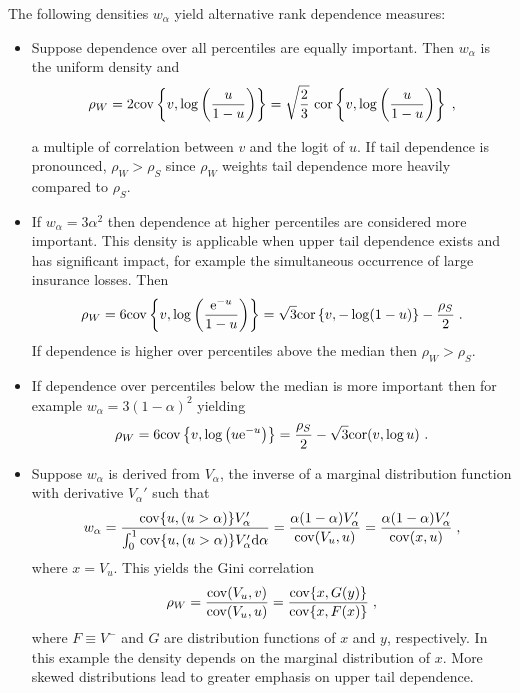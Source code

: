 \documentclass[authoryear]{elsarticle}
\newcommand{\cov}{{\rm cov}}
\newcommand{\cor}{\mathrm{cor}}
\newcommand{\e}{\mathrm{e}}
\newcommand{\de}{\mathrm{d}}
\begin{document}
The following densities $w_\alpha$ yield alternative rank dependence measures:
\begin{itemize}

\item Suppose dependence over all percentiles are equally important.   Then $w_\alpha$ is the uniform density and
$$
\rho_W =2\cov\left\{v,\log\left(\frac{u}{1-u}\right)\right\}
= \sqrt{\frac{2}{3}}\ \cor\left\{v,\log\left(\frac{u}{1-u}\right)\right\} \;,
$$

a multiple of correlation between $v$ and the logit of $u$. If tail dependence is pronounced, $\rho_W>\rho_S$ since $\rho_W$ weights tail dependence more heavily compared to $\rho_S$.

\item If $w_\alpha=3\alpha^2$  then dependence at higher percentiles are considered more important. This density is applicable when upper tail dependence exists and has significant impact, for example the simultaneous occurrence of large insurance losses. Then
$$
\rho_W = 6\cov\left\{v,\log\left(\frac{\e^{-u}}{1-u}\right) \right\}
=\sqrt{3} \cor\left\{v,-\log(1-u)\right\}-\frac{\rho_S}{2}\;.
$$
If dependence is higher over percentiles above the median then $\rho_W>\rho_S$.

\item If dependence over percentiles below the median is more important then for example  $w_\alpha=3(1-\alpha)^2$ yielding
$$
\rho_W = 6\cov\left\{v,\log \left( u \e^{-u}\right) \right\}
= \frac{\rho_S}{2}  - \sqrt{3}\cor(v,\log u ) \ .
$$


\item Suppose $w_\alpha$ is derived from $V_\alpha$, the inverse of a marginal distribution function with derivative $V_\alpha'$ such that
$$
w_\alpha = \frac{\cov\{u,(u>\alpha)\}V_\alpha'}{\int_0^1 \cov\{u,(u>\alpha)\}V_\alpha' \de\alpha}
=\frac{\alpha(1-\alpha)V_\alpha'}{\cov(V_u,u)}
=\frac{\alpha(1-\alpha)V_\alpha'}{\cov(x,u)} \;,
$$
where $x=V_u$. This yields the Gini correlation  \citep{schechtman1999proper}
$$
\rho_W=\frac{\cov(V_u,v)}{\cov(V_u,u)} = \frac{\cov\{x,G(y)\}}{\cov\{x,F(x)\}} \;,
$$
where $F\equiv V^-$ and $G$ are distribution functions of $x$ and $y$, respectively.  In this example the density depends on the marginal distribution of $x$. More skewed distributions lead to greater emphasis on upper tail dependence.

\end{itemize}
\end{document}
